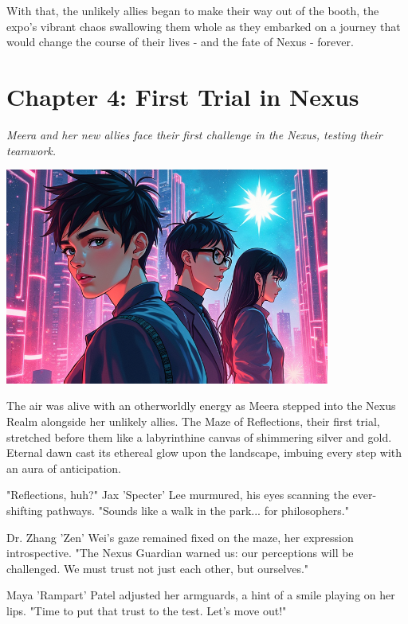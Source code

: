 \documentclass[12pt]{book}
\begin{document}
With that, the unlikely allies began to make their way out of the booth,
the expo's vibrant chaos swallowing them whole as they embarked on a
journey that would change the course of their lives - and the fate of
Nexus - forever.


\newpage

\chapter*{Chapter 4: First Trial in Nexus}
\textit{Meera and her new allies face their first challenge in the Nexus, testing their teamwork.}

\begin{center}
\includegraphics[width=0.8\textwidth]{stories/my_story/step_6/scenes/nexus_challenge.live.png}
\end{center}

The air was alive with an otherworldly energy as Meera stepped into the
Nexus Realm alongside her unlikely allies. The Maze of Reflections,
their first trial, stretched before them like a labyrinthine canvas of
shimmering silver and gold. Eternal dawn cast its ethereal glow upon the
landscape, imbuing every step with an aura of anticipation.

"Reflections, huh?" Jax 'Specter' Lee murmured, his eyes scanning the
ever-shifting pathways. "Sounds like a walk in the park... for
philosophers."

Dr. Zhang 'Zen' Wei's gaze remained fixed on the maze, her expression
introspective. "The Nexus Guardian warned us: our perceptions will be
challenged. We must trust not just each other, but ourselves."

Maya 'Rampart' Patel adjusted her armguards, a hint of a smile playing
on her lips. "Time to put that trust to the test. Let's move out!"
\end{document}
